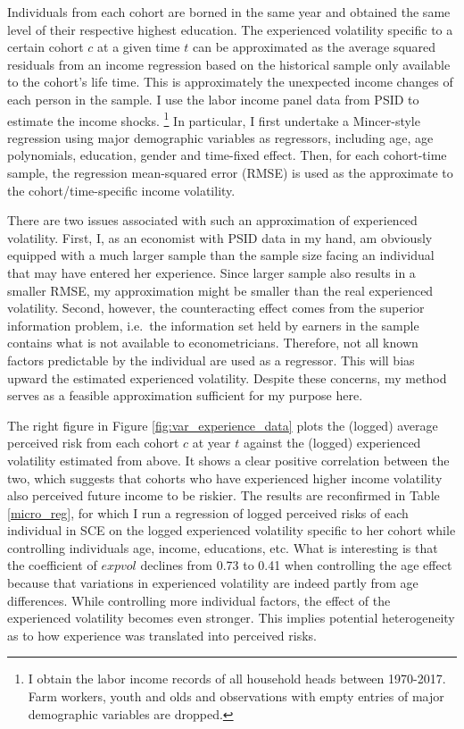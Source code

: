 \documentclass[12pt,notitlepage,onecolumn,aps,pra]{article}
\begin{document}
Individuals from each cohort are borned in the same year and obtained
the same level of their respective highest education. The experienced
volatility specific to a certain cohort \(c\) at a given time \(t\) can
be approximated as the average squared residuals from an income
regression based on the historical sample only available to the cohort's
life time. This is approximately the unexpected income changes of each
person in the sample. I use the labor income panel data from PSID to
estimate the income shocks.
\footnote{I obtain the labor income records of all household heads between 1970-2017. Farm workers, youth and olds and observations with empty entries of major demographic variables are dropped. }
In particular, I first undertake a Mincer-style regression using major
demographic variables as regressors, including age, age polynomials,
education, gender and time-fixed effect. Then, for each cohort-time
sample, the regression mean-squared error (RMSE) is used as the
approximate to the cohort/time-specific income volatility.

There are two issues associated with such an approximation of
experienced volatility. First, I, as an economist with PSID data in my
hand, am obviously equipped with a much larger sample than the sample
size facing an individual that may have entered her experience. Since
larger sample also results in a smaller RMSE, my approximation might be
smaller than the real experienced volatility. Second, however, the
counteracting effect comes from the superior information problem,
i.e.~the information set held by earners in the sample contains what is
not available to econometricians. Therefore, not all known factors
predictable by the individual are used as a regressor. This will bias
upward the estimated experienced volatility. Despite these concerns, my
method serves as a feasible approximation sufficient for my purpose
here.

The right figure in Figure \ref{fig:var_experience_data} plots the
(logged) average perceived risk from each cohort \(c\) at year \(t\)
against the (logged) experienced volatility estimated from above. It
shows a clear positive correlation between the two, which suggests that
cohorts who have experienced higher income volatility also perceived
future income to be riskier. The results are reconfirmed in Table
\ref{micro_reg}, for which I run a regression of logged perceived risks
of each individual in SCE on the logged experienced volatility specific
to her cohort while controlling individuals age, income, educations,
etc. What is interesting is that the coefficient of \(expvol\) declines
from 0.73 to 0.41 when controlling the age effect because that
variations in experienced volatility are indeed partly from age
differences. While controlling more individual factors, the effect of
the experienced volatility becomes even stronger. This implies potential
heterogeneity as to how experience was translated into perceived risks.
\end{document}
